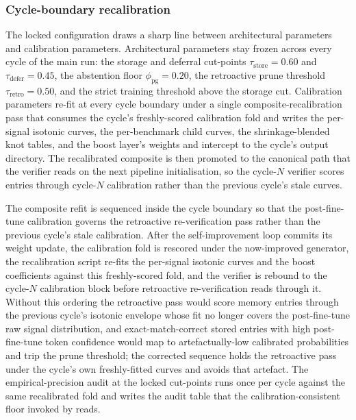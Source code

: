 \subsubsection{Cycle-boundary recalibration}
\label{sec:conformal-cycle-recalib}

The locked configuration draws a sharp line between architectural parameters and calibration parameters. Architectural parameters stay frozen across every cycle of the main run: the storage and deferral cut-points $\tau_{\text{store}} = 0.60$ and $\tau_{\text{defer}} = 0.45$, the abstention floor $\phi_{\text{pg}} = 0.20$, the retroactive prune threshold $\tau_{\text{retro}} = 0.50$, and the strict training threshold above the storage cut. Calibration parameters re-fit at every cycle boundary under a single composite-recalibration pass that consumes the cycle's freshly-scored calibration fold and writes the per-signal isotonic curves, the per-benchmark child curves, the shrinkage-blended knot tables, and the boost layer's weights and intercept to the cycle's output directory. The recalibrated composite is then promoted to the canonical path that the verifier reads on the next pipeline initialisation, so the cycle-$N$ verifier scores entries through cycle-$N$ calibration rather than the previous cycle's stale curves.

The composite refit is sequenced inside the cycle boundary so that the post-fine-tune calibration governs the retroactive re-verification pass rather than the previous cycle's stale calibration. After the self-improvement loop commits its weight update, the calibration fold is rescored under the now-improved generator, the recalibration script re-fits the per-signal isotonic curves and the boost coefficients against this freshly-scored fold, and the verifier is rebound to the cycle-$N$ calibration block before retroactive re-verification reads through it. Without this ordering the retroactive pass would score memory entries through the previous cycle's isotonic envelope whose fit no longer covers the post-fine-tune raw signal distribution, and exact-match-correct stored entries with high post-fine-tune token confidence would map to artefactually-low calibrated probabilities and trip the prune threshold; the corrected sequence holds the retroactive pass under the cycle's own freshly-fitted curves and avoids that artefact. The empirical-precision audit at the locked cut-points runs once per cycle against the same recalibrated fold and writes the audit table that the calibration-consistent floor invoked by  reads.

